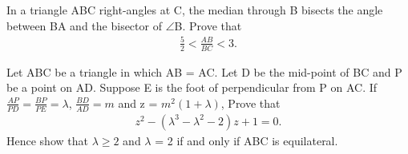 \item In a triangle ABC right-angles at C, the median through B bisects the angle between BA and the bisector of $\angle$B. Prove that
\begin{align*}
\frac{5}{2} < \frac{AB}{BC} < 3.
\end{align*}

\item Let ABC be a triangle in which AB = AC. Let D be the mid-point of BC and P be a point on AD. Suppose E is the foot of perpendicular from P on AC. If $\frac{AP}{PD} = \frac{BP}{PE} = \lambda$, $\frac{BD}{AD} = m$ and z = $m^{2}(1 + \lambda)$, Prove that
\begin{align*}
z^{2} - (\lambda^{3} - \lambda^{2} - 2)z + 1 = 0.
\end{align*}
Hence show that $\lambda \geq 2$ and $\lambda$ = 2 if and only if ABC is equilateral. 





















